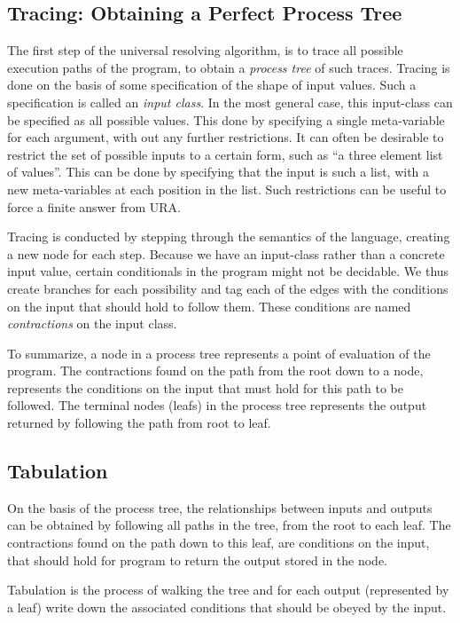 \documentclass[10pt]{../sigplanconf}
\begin{document}
\subsection{Tracing: Obtaining a Perfect Process Tree}
The first step of the universal resolving algorithm, is to trace all
possible execution paths of the program, to obtain a \textit{process
  tree} of such traces. Tracing is done on the basis of some
specification of the shape of input values. Such a specification is
called an \textit{input class}. In the most general case, this
input-class can be specified as all possible values. This done by
specifying a single meta-variable for each argument, with out any
further restrictions. It can often be desirable to restrict the set of
possible inputs to a certain form, such as ``a three element list of
values''. This can be done by specifying that the input is such a
list, with a new meta-variables at each position in the list. Such
restrictions can be useful to force a finite answer from URA. 

Tracing is conducted by stepping through the semantics of the
language, creating a new node for each step. Because we have an
input-class rather than a concrete input value, certain conditionals
in the program might not be decidable. We thus create branches for
each possibility and tag each of the edges with the conditions on the
input that should hold to follow them. These conditions are named
\textit{contractions} on the input class.

To summarize, a node in a process tree represents a point of
evaluation of the program. The contractions found on the path from the
root down to a node, represents the conditions on the input that must
hold for this path to be followed. The terminal nodes (leafs) in the
process tree represents the output returned by following the path from
root to leaf.


\subsection{Tabulation}
On the basis of the process tree, the relationships between inputs and
outputs can be obtained by following all paths in the tree, from the
root to each leaf. The contractions found on the path down to this
leaf, are conditions on the input, that should hold for program to
return the output stored in the node.

Tabulation is the process of walking the tree and for each output
(represented by a leaf) write down the associated conditions that
should be obeyed by the input.
\end{document}
